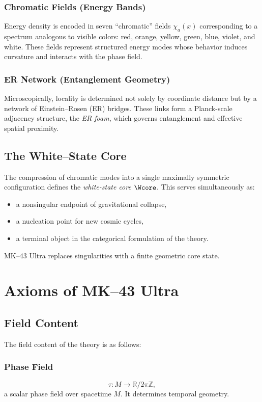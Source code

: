 \subsection{Chromatic Fields (Energy Bands)}
Energy density is encoded in seven ``chromatic'' fields $\chi_a(x)$ corresponding to a spectrum analogous to visible colors: 
red, orange, yellow, green, blue, violet, and white. 
These fields represent structured energy modes whose behavior induces curvature and interacts with the phase field.

\subsection{ER Network (Entanglement Geometry)}
Microscopically, locality is determined not solely by coordinate distance but by a network of Einstein--Rosen (ER) bridges. 
These links form a Planck-scale adjacency structure, the \emph{ER foam}, which governs entanglement and effective spatial proximity.

\section{The White--State Core}

The compression of chromatic modes into a single maximally symmetric configuration defines the \emph{white-state core} $\Wcore$. 
This serves simultaneously as:
\begin{itemize}
  \item a nonsingular endpoint of gravitational collapse,
  \item a nucleation point for new cosmic cycles,
  \item a terminal object in the categorical formulation of the theory.
\end{itemize}

MK--43 Ultra replaces singularities with a finite geometric core state.

\chapter{Axioms of MK--43 Ultra}

\section{Field Content}

The field content of the theory is as follows:

\subsection{Phase Field}
\[
  \tau : M \to \mathbb{R}/2\pi\mathbb{Z}, 
\]
a scalar phase field over spacetime $M$. 
It determines temporal geometry.

